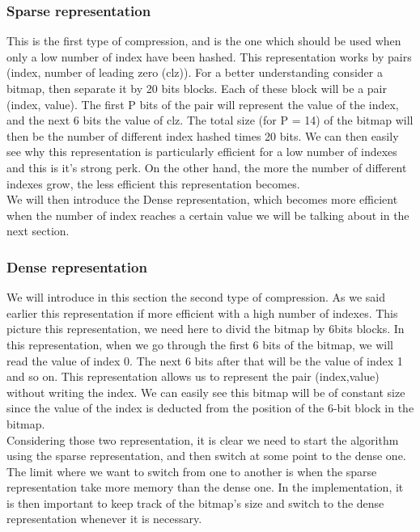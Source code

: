 \documentclass{article}
\begin{document}
\subsubsection{Sparse representation}
This is the first type of compression, and is the one which should be used when only a low number of index have been hashed. This representation works by pairs (index, number of leading zero (clz)). For a  better understanding consider a bitmap, then separate it by 20 bits blocks. Each of these block will be a pair (index, value). The first P bits of the pair will represent the value of the index, and the next 6 bits the value of clz. The total size (for P = 14) of the bitmap will then be the number of different index hashed times 20 bits. We can then easily see why this representation is particularly efficient for a low number of indexes and this is it's strong perk. On the other hand, the more the number of different indexes grow, the less efficient this representation becomes. \\ 
We will then introduce the Dense representation, which becomes more efficient when the number of index reaches a certain value we will be talking about in the next section. 

\subsubsection{Dense representation}
We will introduce in this section the second type of compression. As we said earlier this representation if more efficient with a high number of indexes. This picture this representation, we need here to divid the bitmap by 6bits blocks. In this representation, when we go through the first 6 bits of the bitmap, we will read the value of index 0. The next 6 bits after that will be the value of index 1 and so on. This representation allows us to represent the pair (index,value) without writing the index. We can easily see this bitmap will be of constant size since the value of the index is deducted from the position of the 6-bit block in the bitmap. \\
Considering those two representation, it is clear we need to start the algorithm using the sparse representation, and then switch at some point to the dense one. The limit where we want to switch from one to another is when the sparse representation take more memory than the dense one. In the implementation, it is then important to keep track of the bitmap's size and switch to the dense representation whenever it is necessary.
\end{document}
